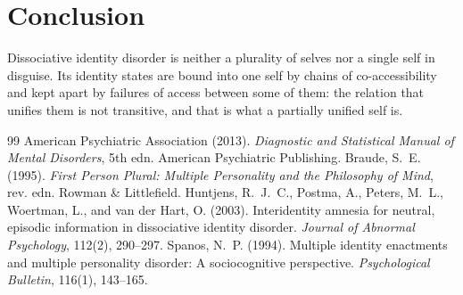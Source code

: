 \documentclass{situationist-preprint}
\begin{document}
\section{Conclusion}

Dissociative identity disorder is neither a plurality of selves nor a single self in disguise. Its identity states are bound into one self by chains of co-accessibility and kept apart by failures of access between some of them: the relation that unifies them is not transitive, and that is what a partially unified self is.

\begin{thebibliography}{99}\small
{} American Psychiatric Association (2013). \emph{Diagnostic and Statistical Manual of Mental Disorders}, 5th edn. American Psychiatric Publishing.
 Braude, S.~E. (1995). \emph{First Person Plural: Multiple Personality and the Philosophy of Mind}, rev. edn. Rowman \& Littlefield.
 Huntjens, R.~J.~C., Postma, A., Peters, M.~L., Woertman, L., and van der Hart, O. (2003). Interidentity amnesia for neutral, episodic information in dissociative identity disorder. \emph{Journal of Abnormal Psychology}, 112(2), 290--297.
 Spanos, N.~P. (1994). Multiple identity enactments and multiple personality disorder: A sociocognitive perspective. \emph{Psychological Bulletin}, 116(1), 143--165.
\end{thebibliography}
\end{document}
